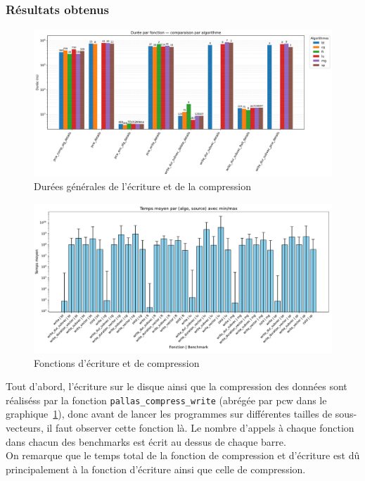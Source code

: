 \subsubsection{Résultats obtenus}\label{ssec:wrt_res}

\begin{figure}[!h]
    \centering
    \includegraphics[width=1\textwidth]{img/pcw_global.png}
    \caption{Durées générales de l'écriture et de la compression}
    \label{fig:pcw_global}
\end{figure}
\begin{figure}[!h]
    \centering
    \includegraphics[width=1\textwidth]{img/nas_comp_write.pdf}
    \caption{Fonctions d'écriture et de compression}
    \label{fig:cw_global}
\end{figure}
Tout d'abord, l'écriture sur le disque ainsi que la compression des données sont réaliséss par la fonction \verb!pallas_compress_write! (abrégée par pcw dans le graphique~\ref{fig:pcw_global}),
donc avant de lancer les programmes sur différentes tailles de sous-vecteurs, il faut observer cette fonction là.
Le nombre d'appels à chaque fonction dans chacun des benchmarks est écrit au dessus de chaque barre.\\
On remarque que le temps total de la fonction de compression et d'écriture est dû principalement à la fonction d'écriture ainsi que celle de compression.

